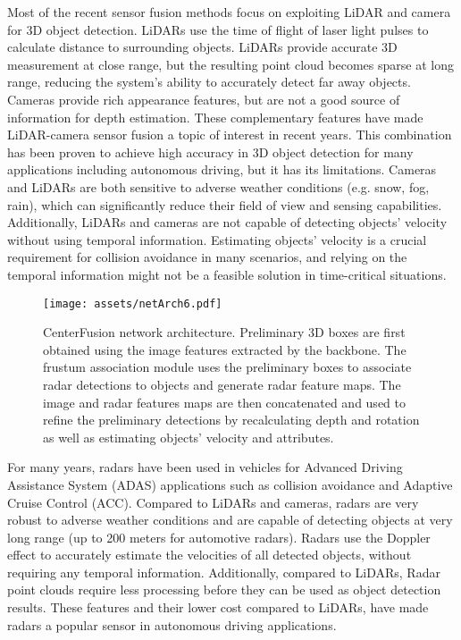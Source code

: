 \documentclass[10pt,twocolumn,letterpaper]{article}
\newcommand\method{CenterFusion}
\begin{document}
   Most of the recent sensor fusion methods focus on exploiting LiDAR and camera
   for 3D object detection. LiDARs use the time of flight of laser light pulses 
   to calculate distance to surrounding objects. LiDARs provide accurate 3D 
   measurement at close range, but the resulting point cloud becomes sparse at 
   long range, reducing the system's ability to accurately detect far away objects.
   Cameras provide rich appearance features, but are not a good source of 
   information for depth estimation. These complementary features have made 
   LiDAR-camera sensor fusion a topic of interest in recent years. 
   This combination has been proven to achieve high accuracy in 3D 
   object detection for many applications including autonomous driving,
   but it has its limitations. Cameras and LiDARs are both 
   sensitive to adverse weather conditions (e.g. snow, fog, rain), which can
   significantly reduce their field of view and sensing capabilities. 
   Additionally, LiDARs and cameras are not capable of detecting objects' 
   velocity without using temporal information. Estimating objects' 
   velocity is a crucial requirement for collision avoidance in many scenarios, 
   and relying on the temporal information might not be a feasible solution 
   in time-critical situations.
   
   \begin{figure*}[t]
      \texttt{[image: assets/netArch6.pdf]}
      \caption{\method{} network architecture. Preliminary 3D boxes 
      are first obtained using the image features extracted by the backbone. The 
      frustum association module uses the preliminary boxes to associate 
      radar detections to objects and generate radar feature maps. 
      The image and radar features maps are then concatenated and used to 
      refine the preliminary detections by recalculating depth and rotation
      as well as estimating objects' velocity and attributes.}
      \label{fig:netArch}
   \end{figure*}
   
   
   For many years, radars have been used in vehicles for Advanced Driving
   Assistance System (ADAS) applications such as collision avoidance and 
   Adaptive Cruise Control (ACC). Compared to LiDARs and cameras, radars are very 
   robust to adverse weather conditions and are capable of detecting objects 
   at very long range (up to 200 meters for automotive radars). 
   Radars use the Doppler effect to accurately estimate the 
   velocities of all detected objects, without requiring any temporal information.
   Additionally, compared to LiDARs, Radar point clouds require less processing 
   before they can be used as object detection results.
   These features and their lower cost compared to LiDARs, 
   have made radars a popular sensor in autonomous driving applications. 
   
\end{document}
